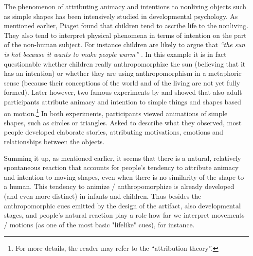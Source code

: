 \documentclass{frontiersSCNS} %
\begin{document}
The phenomenon of attributing animacy and intentions to nonliving objects such as simple shapes has been intensively studied in developmental psychology. As mentioned earlier, Piaget found that children tend to ascribe life to the nonliving. They also tend to interpret physical phenomena in terms of intention on the part of the non-human subject. For instance children are likely to argue that \textit{``the sun is hot because it wants to make people warm''} \citep{leeds_childrens_1992}. In this example it is in fact questionable whether children really anthropomorphize the sun (believing that it has an intention) or whether they are using anthropomorphism in a metaphoric sense (because their conceptions of the world and of the living are not yet fully formed). Later however, two famous experiments by \cite{heider_experimental_1944} and \cite{michotte_perception_1963} showed that also adult participants attribute animacy and intention to simple things and shapes based on motion.\footnote{For more details, the reader may refer to the ``attribution theory''.} In both experiments, participants viewed animations of simple shapes, such as circles or triangles. 
Asked to describe what they observed, most people developed elaborate stories, attributing motivations, emotions and relationships between the objects.


Summing it up, as mentioned earlier, it seems that there is a natural, relatively spontaneous reaction that accounts for people's tendency to attribute animacy and intention to moving shapes, even when there is no similarity of the shape to a human. This tendency to animize / anthropomorphize is already developed (and even more distinct) in infants and children. Thus besides the anthropomorphic cues emitted by the design of the artifact, also developmental stages, and people's natural reaction play a role how far we interpret movements / motions (as one of the most basic "lifelike" cues), for instance.
\end{document}

